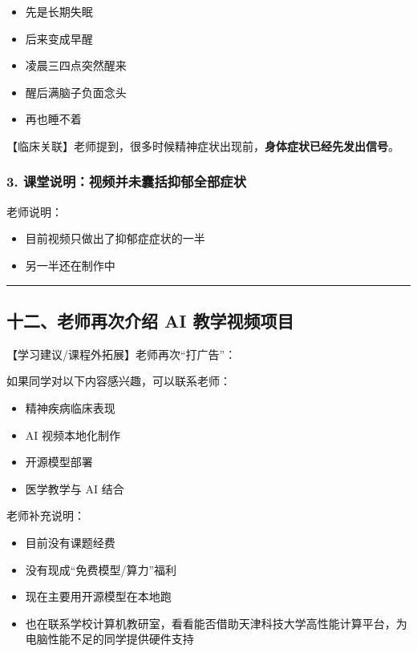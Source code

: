 \documentclass[
  chinese,
  9pt,
  a4paper,
]{ctexart}
\providecommand{\tightlist}{%
  \setlength{\itemsep}{0pt}\setlength{\parskip}{0pt}}
\begin{document}
\begin{itemize}
\tightlist
\item
  先是长期失眠
\item
  后来变成早醒
\item
  凌晨三四点突然醒来
\item
  醒后满脑子负面念头
\item
  再也睡不着
\end{itemize}

【临床关联】老师提到，很多时候精神症状出现前，\textbf{身体症状已经先发出信号}。

\subsubsection{3.
课堂说明：视频并未囊括抑郁全部症状}\label{ux8bfeux5802ux8bf4ux660eux89c6ux9891ux5e76ux672aux56caux62ecux6291ux90c1ux5168ux90e8ux75c7ux72b6}

老师说明：

\begin{itemize}
\tightlist
\item
  目前视频只做出了抑郁症症状的一半
\item
  另一半还在制作中
\end{itemize}

\begin{center}\rule{0.5\linewidth}{0.5pt}\end{center}

\subsection{十二、老师再次介绍 AI
教学视频项目}\label{ux5341ux4e8cux8001ux5e08ux518dux6b21ux4ecbux7ecd-ai-ux6559ux5b66ux89c6ux9891ux9879ux76ee}

【学习建议/课程外拓展】老师再次``打广告''：

如果同学对以下内容感兴趣，可以联系老师：

\begin{itemize}
\tightlist
\item
  精神疾病临床表现
\item
  AI 视频本地化制作
\item
  开源模型部署
\item
  医学教学与 AI 结合
\end{itemize}

老师补充说明：

\begin{itemize}
\tightlist
\item
  目前没有课题经费
\item
  没有现成``免费模型/算力''福利
\item
  现在主要用开源模型在本地跑
\item
  也在联系学校计算机教研室，看看能否借助天津科技大学高性能计算平台，为电脑性能不足的同学提供硬件支持
\end{itemize}
\end{document}
